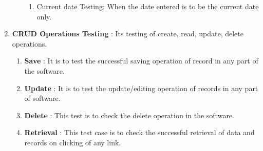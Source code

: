 \begin{enumerate}
\begin{itemize}
\begin{enumerate}
      \item  Current date Testing: When the date entered is to be the current date only. 
    \end{enumerate}     
\end{itemize}
\item \textbf{CRUD Operations Testing} : Its testing of create, read, update, delete operations.
    \begin{enumerate}
\item \textbf{Save} : It is to test the successful saving operation of record in any part of the software.
\item \textbf{Update} : It is to test the update/editing operation of records in any part of software. 
\item \textbf{Delete} : This test is to check the delete operation in the software. 
\item \textbf{Retrieval} : This test case is to check the successful retrieval of data and records on clicking of any link.
    \end{enumerate}
\end{enumerate}
